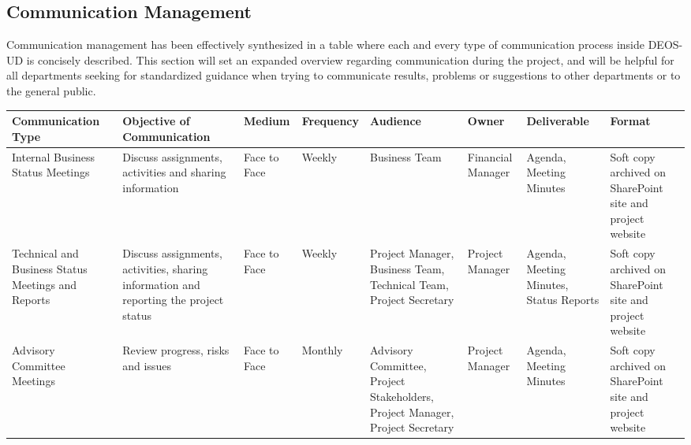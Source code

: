 \subsection{Communication Management}

Communication management has been effectively synthesized in a table where each and every type of communication process inside DEOS-UD is concisely described. This section will set an expanded overview regarding communication during the project, and will be helpful for all departments seeking for standardized guidance when trying to communicate results, problems or suggestions to other departments or to the general public. 

\begin{landscape}
	
	
	\begin{longtable}{| >{\raggedright\arraybackslash}p{2.8cm}  | >{\raggedright\arraybackslash}p{2.8cm} | >{\raggedright\arraybackslash}p{2cm} | >{\raggedright\arraybackslash}p{2cm} | >{\raggedright\arraybackslash}p{2cm} | >{\raggedright\arraybackslash}p{2.4cm} | >{\raggedright\arraybackslash}p{2.4cm} | >{\raggedright\arraybackslash}p{2.4cm} |  }
		
		
		\toprule [2pt]
		
		\textbf{Communication Type} & \textbf{Objective of Communication} & \textbf{Medium}  &\textbf{Frequency} &\textbf{Audience}& \textbf{Owner}& \textbf{Deliverable} &\textbf{Format} \\  
		
		\midrule [1.5pt]
		\endhead
		
		Internal Business Status Meetings& Discuss assignments, activities and sharing information  & Face to Face   &  Weekly &Business Team     & Financial Manager  & Agenda, Meeting Minutes  &Soft copy archived on SharePoint site and project website\\  
		
		\hline
		
		Technical and Business Status Meetings and Reports&Discuss assignments, activities, sharing information and reporting the project status   &Face to Face    & Weekly  & Project Manager, Business Team, Technical Team, Project Secretary    &Project Manager   & Agenda, Meeting Minutes, Status Reports  &Soft copy archived on SharePoint site and project website\\  
		
		\hline
		
		Advisory Committee Meetings& Review progress, risks and issues  & Face to Face   &Monthly   &  Advisory Committee, Project Stakeholders, Project Manager, Project Secretary   &Project Manager   & Agenda, Meeting Minutes  &Soft copy archived on SharePoint site and project website\\  
		

\end{longtable}
\end{landscape}
